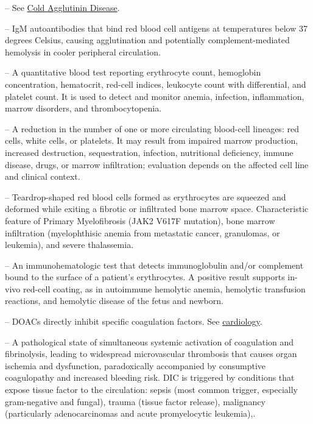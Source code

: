 -- See \hyperlink{Cold Agglutinin Disease}{Cold Agglutinin Disease}.

-- IgM autoantibodies that bind red blood cell antigens at temperatures below 37 degrees Celsius, causing agglutination and potentially complement-mediated hemolysis in cooler peripheral circulation.

-- A quantitative blood test reporting erythrocyte count, hemoglobin concentration, hematocrit, red-cell indices, leukocyte count with differential, and platelet count. It is used to detect and monitor anemia, infection, inflammation, marrow disorders, and thrombocytopenia.

-- A reduction in the number of one or more circulating blood-cell lineages: red cells, white cells, or platelets. It may result from impaired marrow production, increased destruction, sequestration, infection, nutritional deficiency, immune disease, drugs, or marrow infiltration; evaluation depends on the affected cell line and clinical context.

-- Teardrop-shaped red blood cells formed as erythrocytes are squeezed and deformed while exiting a fibrotic or infiltrated bone marrow space. Characteristic feature of Primary Myelofibrosis (JAK2 V617F mutation), bone marrow infiltration (myelophthisic anemia from metastatic cancer, granulomas, or leukemia), and severe thalassemia.

-- An immunohematologic test that detects immunoglobulin and/or complement bound to the surface of a patient’s erythrocytes. A positive result supports in-vivo red-cell coating, as in autoimmune hemolytic anemia, hemolytic transfusion reactions, and hemolytic disease of the fetus and newborn.

-- DOACs directly inhibit specific coagulation factors. See \hyperlink{Cardiology}{cardiology}.

-- A pathological state of simultaneous systemic activation of coagulation and fibrinolysis, leading to widespread microvascular thrombosis that causes organ ischemia and dysfunction, paradoxically accompanied by consumptive coagulopathy and increased bleeding risk. DIC is triggered by conditions that expose tissue factor to the circulation: sepsis (most common trigger, especially gram-negative and fungal), trauma (tissue factor release), malignancy (particularly adenocarcinomas and acute promyelocytic leukemia),.


